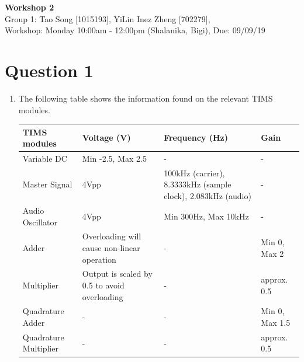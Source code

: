 \documentclass[11pt]{article}
\begin{document}

\newpage
\begin{center}
\textbf{\Large{Workshop 2}}\\
Group 1: Tao Song [1015193], YiLin Inez Zheng [702279], \\
Workshop: Monday 10:00am - 12:00pm (Shalanika, Bigi), Due: 09/09/19  
\end{center}


\section*{Question 1}
\begin{enumerate}[label=(\alph*)]
\item
The following table shows the information found on the relevant TIMS modules.
\begin{center}
 \begin{tabular}{|m{4cm}|m{3cm}|m{5.5cm}|m{2.5cm}|} 
 \hline
\textbf{TIMS modules} & \textbf{Voltage (V)} & \textbf{Frequency (Hz)} & \textbf{Gain}\\ 
 \hline
 Variable DC & Min -2.5, Max 2.5 & - & - \\
 \hline
 Master Signal & 4Vpp & 100kHz (carrier), 8.3333kHz (sample clock), 2.083kHz (audio) & - \\
 \hline
 Audio Oscillator & 4Vpp & Min 300Hz, Max 10kHz & - \\
 \hline
 Adder & Overloading will cause non-linear operation & - & Min 0, Max 2 \\
 \hline
 Multiplier & Output is scaled by 0.5 to avoid overloading & - & approx. 0.5 \\
 \hline
 Quadrature Adder & - & - & Min 0, Max 1.5 \\
 \hline
 Quadrature Multiplier & - & - & approx. 0.5 \\
 \hline
\end{tabular}
\end{center}

\end{enumerate}
\end{document}
